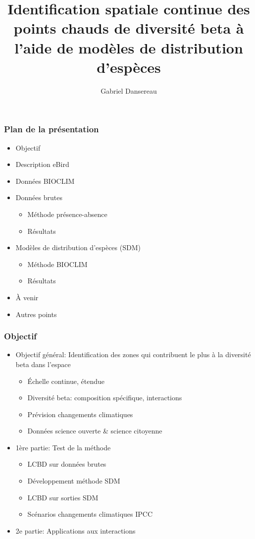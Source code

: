 \documentclass[10pt]{beamer}
\title{Identification spatiale continue des points chauds de diversité beta à l'aide de modèles de distribution d'espèces}
\author{Gabriel Dansereau}
\begin{document}
\begin{frame}
  \titlepage
\end{frame}

\begin{frame}
  \frametitle{Plan de la présentation}
  \begin{itemize}
    \item Objectif
    \item Description eBird
    \item Données BIOCLIM
    \item Données brutes
    \begin{itemize}
      \item Méthode présence-absence
      \item Résultats
    \end{itemize}
    \item Modèles de distribution d'espèces (SDM)
    \begin{itemize}
      \item Méthode BIOCLIM
      \item Résultats
    \end{itemize}
    \item À venir
    \item Autres points
  \end{itemize}
\end{frame}

\begin{frame}
  \frametitle{Objectif}
  \begin{itemize}
    \item Objectif général: Identification des zones qui contribuent le plus à la diversité beta dans l'espace
    \begin{itemize}
      \item Échelle continue, étendue
      \item Diversité beta: composition spécifique, interactions
      \item Prévision changements climatiques
      \item Données science ouverte \& science citoyenne
    \end{itemize}
    \medskip
    \item 1ère partie: Test de la méthode
    \begin{itemize}
      \item LCBD sur données brutes
      \item Développement méthode SDM
      \item LCBD sur sorties SDM
      \item Scénarios changements climatiques IPCC
    \end{itemize}
    \medskip
    \item 2e partie: Applications aux interactions
  \end{itemize}
\end{frame}
\end{document}
